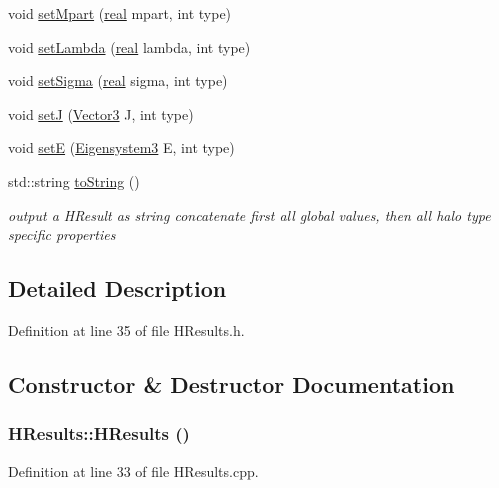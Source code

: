 \begin{DoxyCompactItemize}
void \hyperlink{classHResults_a98894da316321425e9eb8d064b5ab9bf}{setMpart} (\hyperlink{Global_8h_a031f8951175b43076c2084a6c2173410}{real} mpart, int type)
\item 
void \hyperlink{classHResults_a7f5dec2fe246d2e35a315edc8c4d2349}{setLambda} (\hyperlink{Global_8h_a031f8951175b43076c2084a6c2173410}{real} lambda, int type)
\item 
void \hyperlink{classHResults_a3aea44b516fd1a68983fee0f3de77ea7}{setSigma} (\hyperlink{Global_8h_a031f8951175b43076c2084a6c2173410}{real} sigma, int type)
\item 
void \hyperlink{classHResults_a0c6431cb687fd3f06c2d0d7792d76e5c}{setJ} (\hyperlink{classVector3}{Vector3} J, int type)
\item 
void \hyperlink{classHResults_afd0c60a0b27e380ae766a3755461e769}{setE} (\hyperlink{classEigensystem3}{Eigensystem3} E, int type)
\item 
std::string \hyperlink{classHResults_af4b87d0a35443db45747a606b0a2549f}{toString} ()
\begin{DoxyCompactList}\small\item\em output a HResult as string concatenate first all global values, then all halo type specific properties \item\end{DoxyCompactList}\end{DoxyCompactItemize}


\subsection{Detailed Description}


Definition at line 35 of file HResults.h.



\subsection{Constructor \& Destructor Documentation}
\subsubsection[{HResults}]{\setlength{\rightskip}{0pt plus 5cm}HResults::HResults ()}\label{classHResults_af0b4ffdf2d4406e4e4c7074df85b752a}


Definition at line 33 of file HResults.cpp.


